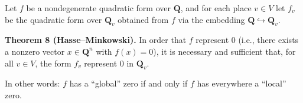 Let $f$ be a nondegenerate quadratic form over $\mathbf{Q}$, and for each place $v \in V$ let $f_v$ be the quadratic form over $\mathbf{Q}_v$ obtained from $f$ via the embedding $\mathbf{Q} \hookrightarrow \mathbf{Q}_v$.

\textbf{Theorem 8 (Hasse–Minkowski).} In order that $f$ represent $0$ (i.e., there exists a nonzero vector $x \in \mathbf{Q}^n$ with $f(x) = 0$), it is necessary and sufficient that, for all $v \in V$, the form $f_v$ represent $0$ in $\mathbf{Q}_v$.

In other words: $f$ has a ``global'' zero if and only if $f$ has everywhere a ``local'' zero.
